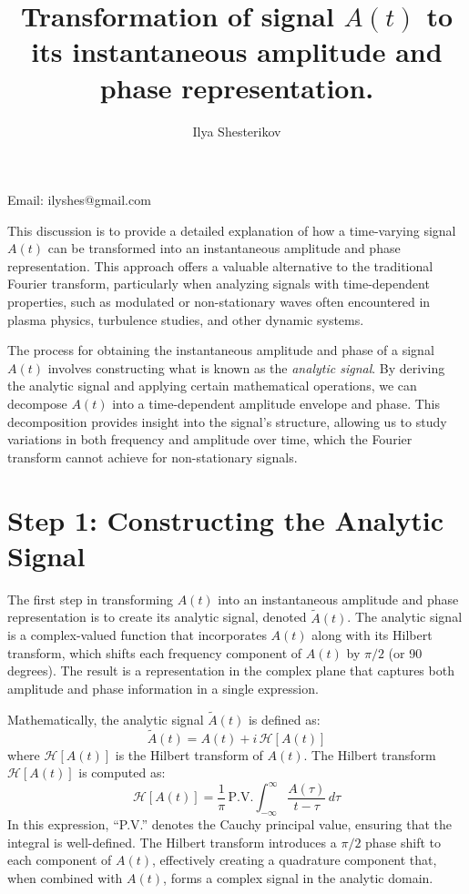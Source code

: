 \documentclass[12pt]{article}
\title{\textbf{Transformation of signal $A(t)$ to its instantaneous amplitude and phase representation. 
}}
\author{Ilya Shesterikov}
\begin{document}
\maketitle

Email: ilyshes@gmail.com

This discussion is to provide a detailed explanation of how a time-varying signal \( A(t) \) can be transformed into an instantaneous amplitude and phase representation. This approach offers a valuable alternative to the traditional Fourier transform, particularly when analyzing signals with time-dependent properties, such as modulated or non-stationary waves often encountered in plasma physics, turbulence studies, and other dynamic systems.

The process for obtaining the instantaneous amplitude and phase of a signal \( A(t) \) involves constructing what is known as the \textit{analytic signal}. By deriving the analytic signal and applying certain mathematical operations, we can decompose \( A(t) \) into a time-dependent amplitude envelope and phase. This decomposition provides insight into the signal's structure, allowing us to study variations in both frequency and amplitude over time, which the Fourier transform cannot achieve for non-stationary signals.



\section*{Step 1: Constructing the Analytic Signal}

The first step in transforming \( A(t) \) into an instantaneous amplitude and phase representation is to create its analytic signal, denoted \( \tilde{A}(t) \). The analytic signal is a complex-valued function that incorporates \( A(t) \) along with its Hilbert transform, which shifts each frequency component of \( A(t) \) by \( \pi/2 \) (or 90 degrees). The result is a representation in the complex plane that captures both amplitude and phase information in a single expression.

Mathematically, the analytic signal \( \tilde{A}(t) \) is defined as:
\[
\tilde{A}(t) = A(t) + i \, \mathcal{H}[A(t)]
\]
where \( \mathcal{H}[A(t)] \) is the Hilbert transform of \( A(t) \). The Hilbert transform \( \mathcal{H}[A(t)] \) is computed as:
\[
\mathcal{H}[A(t)] = \frac{1}{\pi} \, \text{P.V.} \int_{-\infty}^{\infty} \frac{A(\tau)}{t - \tau} \, d\tau
\]
In this expression, ``P.V.'' denotes the Cauchy principal value, ensuring that the integral is well-defined. The Hilbert transform introduces a \( \pi/2 \) phase shift to each component of \( A(t) \), effectively creating a quadrature component that, when combined with \( A(t) \), forms a complex signal in the analytic domain.
\end{document}

